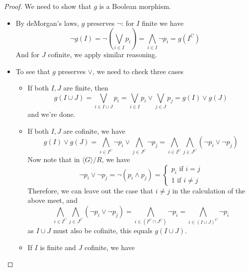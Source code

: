 \documentclass{../util/zariski-small}
\begin{document}
\begin{example}
\begin{proof}
  We need to show that $g$ is a Boolean morphism. 
  \begin{itemize}
    \item 
      By deMorgan's laws, $g$ preserves $\neg$:
      for $I$ finite we have
      \begin{equation}
      \neg g(I) = \neg (\bigvee_{i\in I} p_i) = \bigwedge_{i\in I} \neg p_i = g(I^C)
      \end{equation}
      And for $J$ cofinite, we apply similar reasoning. 
    \item To see that $g$ preserves $\vee$, we need to check three cases
      \begin{itemize}
        \item If both $I,J$ are finite, then 
        \begin{equation} 
          g(I \cup J) = \bigvee_{i\in I \cup J} p_i= \bigvee_{i\in I} p_i \vee \bigvee_{j\in J} p_j 
          = g(I) \vee g(J)
        \end{equation}
        and we're done. 
      \item If both $I,J$ are cofinite, we have
        \begin{equation}
          g(I) \vee g(J) = 
          \bigwedge_{i \in I^C} \neg p_i \vee 
          \bigwedge_{j \in J^C} \neg p_j 
          = 
          \bigwedge_{i\in I^C} 
          \bigwedge_{j \in J^C}(\neg p_i \vee  \neg p_j) 
        \end{equation}
        Now note that in $\langle G \rangle / R$, we have 
        \begin{equation}
          \neg p_i \vee \neg p_j = \neg ( p_i \wedge p_j) = 
          \begin{cases}
            p_i \text{ if } i = j\\
            1 \text{ if } i \neq j  
          \end{cases}
        \end{equation}
        Therefore, we can leave out the case that $i\neq j$ in the calculation of the above meet, and
        \begin{equation}
          \bigwedge_{i\in I^C} 
          \bigwedge_{j \in J^C}(\neg p_i \vee  \neg p_j)  
          = 
          \bigwedge_{i \in (I^C \cap J^C)} \neg p_i
          = 
          \bigwedge_{i \in (I \cup J)^C} \neg p_i 
        \end{equation}
        as $I\cup J$ must also be cofinite, this equals 
          $ g( I \cup J)$. 
        \item 
          If $I$ is finite and $J$ cofinite, we have 

\end{itemize}
\end{itemize}
\end{proof}
\end{example}
\end{document}
